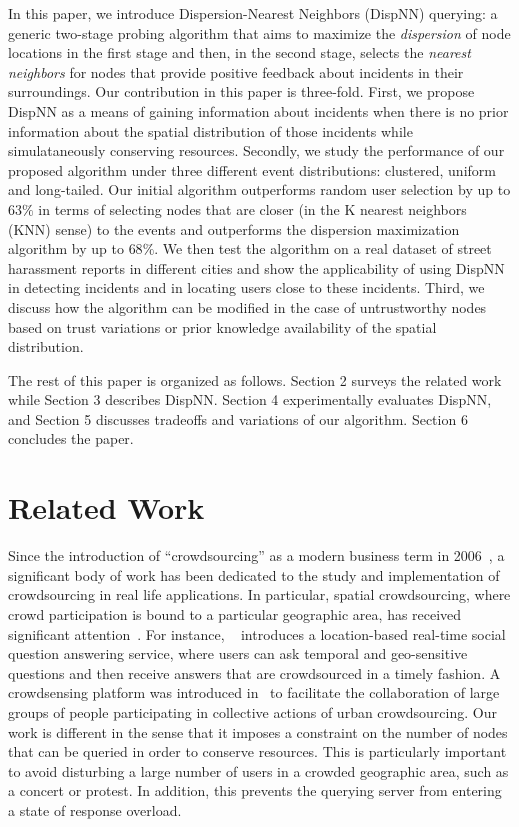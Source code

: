 \documentclass{acm_proc_article-sp}
\begin{document}
In this paper, we introduce Dispersion-Nearest Neighbors (DispNN) querying: a generic two-stage probing algorithm that aims to maximize the \textit{dispersion} of node locations in the first stage and then, in the second stage, selects the \textit{nearest neighbors} for nodes that provide positive feedback about incidents in their surroundings. Our contribution in this paper is three-fold. First, we propose DispNN as a means of gaining information about incidents when there is no prior information about the spatial distribution of those incidents while simulataneously conserving resources.  Secondly, we study the performance of our proposed algorithm under three different event distributions: clustered, uniform and long-tailed. Our initial algorithm outperforms random user selection by up to $63\%$ in terms of selecting nodes that are closer (in the K nearest neighbors (KNN) sense) to the events and outperforms the dispersion maximization algorithm by up to $68\%$. We then test the algorithm on a real dataset of street harassment reports in different cities and show the applicability of using DispNN in detecting incidents and in locating users close to these incidents. Third, we discuss how the algorithm can be modified in the case of untrustworthy nodes based on trust variations or prior knowledge availability of the spatial distribution.\par
The rest of this paper is organized as follows. Section 2 surveys the related work while Section 3 describes DispNN. Section 4 experimentally evaluates DispNN, and Section 5 discusses tradeoffs and variations of our algorithm. Section 6 concludes the paper.
\section{Related Work}
Since the introduction of ``crowdsourcing'' as a modern business term in 2006~\cite{howe2006rise}, a significant body of work has been dedicated to the study and implementation of crowdsourcing in real life applications. In particular, spatial crowdsourcing, where crowd participation is bound to a particular geographic area, has received significant attention~\cite{kazemi2012geocrowd, deng2013maximizing, yu2015quality}. For instance, ~\cite{liu2013using} introduces a location-based real-time social question answering service, where users can ask temporal and geo-sensitive questions and then receive answers that are crowdsourced in a timely fashion. A crowdsensing platform was introduced in~\cite{cardone2013fostering} to facilitate the collaboration of large groups of people participating in collective actions of urban crowdsourcing. Our work is different in the sense that it imposes a constraint on the number of nodes that can be queried in order to conserve resources. This is particularly important to avoid disturbing a large number of users in a crowded geographic area, such as a concert or protest. In addition, this prevents the querying server from entering a state of response overload.\par
\end{document}
